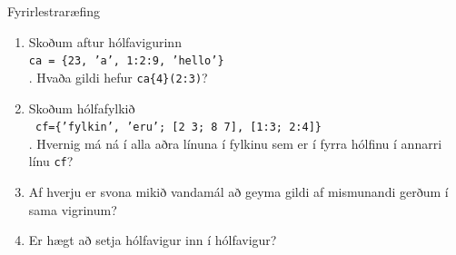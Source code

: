 \documentclass{beamer}
\begin{document}
\begin{frame}[fragile]{Fyrirlestraræfing}
    \begin{enumerate}
        \item Skoðum aftur hólfavigurinn\\ \texttt{ca = \{23, 'a', 1:2:9, 'hello'\} }\\
        . Hvaða gildi hefur \texttt{ca\{4\}(2:3)}?
        \item Skoðum hólfafylkið\\
    \texttt{ cf=\{'fylkin', 'eru'; [2 3; 8 7], [1:3; 2:4]\} }\\
    . Hvernig má ná í alla aðra línuna í fylkinu sem er í fyrra hólfinu í annarri línu \texttt{cf}?
        \item Af hverju er svona mikið vandamál að geyma gildi af mismunandi gerðum í sama vigrinum?
        \item Er hægt að setja hólfavigur inn í hólfavigur?
    \end{enumerate}
\end{frame}
\end{document}
